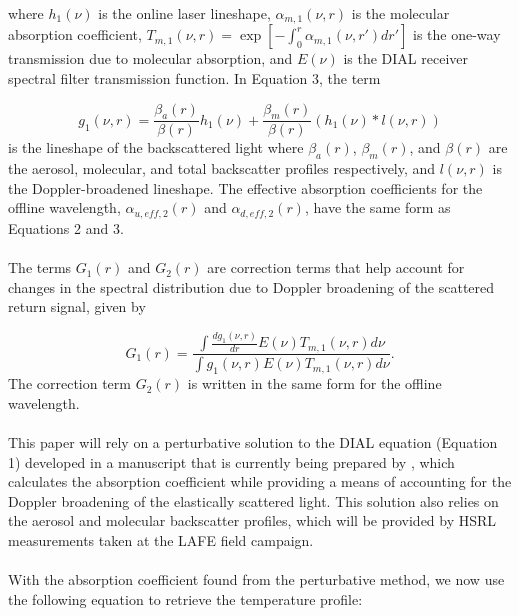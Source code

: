 \documentclass[twoside]{article}
\begin{document}
\noindent where $h_1(\nu)$ is the online laser lineshape, $\alpha_{m,1}(\nu,r)$ is the molecular absorption coefficient, $T_{m,1}(\nu,r) = \exp\left[-\int^r_0 \alpha_{m,1}(\nu,r')dr'\right]$ is the one-way transmission due to molecular absorption, and $E(\nu)$ is the DIAL receiver spectral filter transmission function. 
In Equation 3, the term

\begin{equation}
	g_1(\nu,r) = \frac{\beta_a(r)}{\beta(r)} h_{1}(\nu) + \frac{\beta_m(r)}{\beta(r)} (h_{1}(\nu)\ast l(\nu,r))
\end{equation}
\noindent is the lineshape of the backscattered light where $\beta_a(r)$, $\beta_m(r)$, and $\beta(r)$ are the aerosol, molecular, and total backscatter profiles respectively, and $l(\nu,r)$ is the Doppler-broadened lineshape. 
The effective absorption coefficients for the offline wavelength, $\alpha_{u,eff,2}(r)$ and $\alpha_{d,eff,2}(r)$, have the same form as Equations 2 and 3.
\\
\\
The terms $G_1(r)$ and $G_2(r)$ are correction terms that help account for changes in the spectral distribution due to Doppler broadening of the scattered return signal, given by

\begin{equation}
	G_1(r) = \frac{\int \frac{dg_1(\nu,r)}{dr} E(\nu) T_{m,1}(\nu,r) d\nu}{\int g_1(\nu,r) E(\nu) T_{m,1}(\nu,r) d\nu}.
\end{equation}
\noindent The correction term $G_2(r)$ is written in the same form for the offline wavelength.
\\
\\
This paper will rely on a perturbative solution to the DIAL equation (Equation 1) developed in a manuscript that is currently being prepared by \citet{Bunn2018}, which calculates the absorption coefficient while providing a means of accounting for the Doppler broadening of the elastically scattered light. 
This solution also relies on the aerosol and molecular backscatter profiles, which will be provided by HSRL measurements \cite{Hayman2017} taken at the LAFE field campaign.
\\
\\
With the absorption coefficient found from the perturbative method, we now use the following equation to retrieve the temperature profile:
\end{document}
